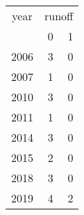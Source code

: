 \footnotesize\begin{tabular}[t]{lrr}
\toprule
\multicolumn{1}{c}{year} & \multicolumn{2}{c}{runoff} \\
\cmidrule(l{3pt}r{3pt}){1-1} \cmidrule(l{3pt}r{3pt}){2-3}
  & 0 & 1\\
\midrule
2006 & 3 & 0\\
2007 & 1 & 0\\
2010 & 3 & 0\\
2011 & 1 & 0\\
2014 & 3 & 0\\
2015 & 2 & 0\\
2018 & 3 & 0\\
2019 & 4 & 2\\
\bottomrule
\end{tabular}
